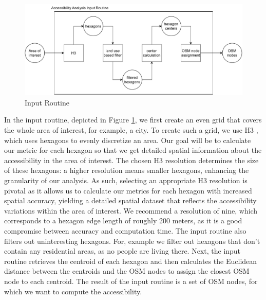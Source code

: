 \begin{figure}
    \centering
    \includegraphics[scale=0.60]{Figures/method/input_routine}
    \caption{Input Routine}
    \label{fig:input_routine}
\end{figure}
In the input routine, depicted in Figure \ref{fig:input_routine}, we first create an even grid that covers the whole area of interest, for example, a city.
To create such a grid, we use H3 , which uses hexagons to evenly discretize an area.
Our goal will be to calculate our metric for each hexagon so that we get detailed spatial information about the accessibility in the area of interest.
The chosen H3 resolution determines the size of these hexagons: a higher resolution means smaller hexagons, enhancing the granularity of our analysis. 
As such, selecting an appropriate H3 resolution is pivotal as it allows us to calculate our metrics for each hexagon with increased spatial accuracy, yielding a detailed spatial dataset that reflects the accessibility variations within the area of interest.
We recommend a resolution of nine, which corresponds to a hexagon edge length of roughly 200 meters, as it is a good compromise between accuracy and computation time.
The input routine also filters out uninteresting hexagons.
For, example we filter out hexagons that don't contain any residential areas, as no people are living there.
Next, the input routine retrieves the centroid of each hexagon and then calculates the Euclidean distance between the centroids and the OSM nodes to assign the closest OSM node to each centroid.
The result of the input routine is a set of OSM nodes, for which we want to compute the accessibility.



